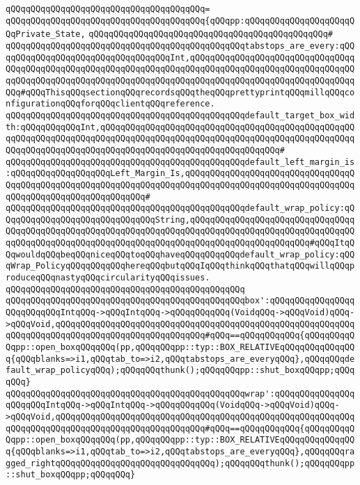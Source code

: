 \verb|qQQqqQQqqQQqqQQqqQQqqQQqqQQqqQQqqQQqqQQq=|\newline
\verb|qQQqqQQqqQQqqQQqqQQqqQQqqQQqqQQqqQQqqQQq{qQQqpp:qQQqqQQqqQQqqQQqqQQqqQQqPrivate_State,|\newline
\verb|qQQqqQQqqQQqqQQqqQQqqQQqqQQqqQQqqQQqqQQqqQQqqQQq#|\newline
\verb|qQQqqQQqqQQqqQQqqQQqqQQqqQQqqQQqqQQqqQQqqQQqqQQqtabstops_are_every:qQQqqQQqqQQqqQQqqQQqqQQqqQQqqQQqqQQqInt,qQQqqQQqqQQqqQQqqQQqqQQqqQQqqQQqqQQqqQQqqQQqqQQqqQQqqQQqqQQqqQQqqQQqqQQqqQQqqQQqqQQqqQQqqQQqqQQqqQQqqQQqqQQqqQQqqQQqqQQqqQQqqQQqqQQqqQQqqQQqqQQqqQQqqQQqqQQqqQQqqQQqqQQqqQQqqQQq#qQQqThisqQQqsectionqQQqrecordsqQQqtheqQQqprettyprintqQQqmillqQQqconfigurationqQQqforqQQqclientqQQqreference.|\newline
\verb|qQQqqQQqqQQqqQQqqQQqqQQqqQQqqQQqqQQqqQQqqQQqqQQqdefault_target_box_width:qQQqqQQqqQQqInt,qQQqqQQqqQQqqQQqqQQqqQQqqQQqqQQqqQQqqQQqqQQqqQQqqQQqqQQqqQQqqQQqqQQqqQQqqQQqqQQqqQQqqQQqqQQqqQQqqQQqqQQqqQQqqQQqqQQqqQQqqQQqqQQqqQQqqQQqqQQqqQQqqQQqqQQqqQQqqQQqqQQqqQQqqQQqqQQq#|\newline
\verb|qQQqqQQqqQQqqQQqqQQqqQQqqQQqqQQqqQQqqQQqqQQqqQQqdefault_left_margin_is:qQQqqQQqqQQqqQQqqQQqLeft_Margin_Is,qQQqqQQqqQQqqQQqqQQqqQQqqQQqqQQqqQQqqQQqqQQqqQQqqQQqqQQqqQQqqQQqqQQqqQQqqQQqqQQqqQQqqQQqqQQqqQQqqQQqqQQqqQQqqQQqqQQqqQQqqQQqqQQqqQQq#|\newline
\verb|qQQqqQQqqQQqqQQqqQQqqQQqqQQqqQQqqQQqqQQqqQQqqQQqdefault_wrap_policy:qQQqqQQqqQQqqQQqqQQqqQQqqQQqqQQqString,qQQqqQQqqQQqqQQqqQQqqQQqqQQqqQQqqQQqqQQqqQQqqQQqqQQqqQQqqQQqqQQqqQQqqQQqqQQqqQQqqQQqqQQqqQQqqQQqqQQqqQQqqQQqqQQqqQQqqQQqqQQqqQQqqQQqqQQqqQQqqQQqqQQqqQQqqQQqqQQqqQQq#qQQqItqQQqwouldqQQqbeqQQqniceqQQqtoqQQqhaveqQQqqQQqqQQqdefault_wrap_policy:qQQqWrap_PolicyqQQqqQQqqQQqhereqQQqbutqQQqIqQQqthinkqQQqthatqQQqwillqQQqproduceqQQqnastyqQQqcircularityqQQqissues.|\newline
\verb|qQQqqQQqqQQqqQQqqQQqqQQqqQQqqQQqqQQqqQQqqQQqqQQq|\newline
\verb|qQQqqQQqqQQqqQQqqQQqqQQqqQQqqQQqqQQqqQQqqQQqqQQqbox':qQQqqQQqqQQqqQQqqQQqqQQqqQQqIntqQQq->qQQqIntqQQq->qQQqqQQqqQQq(VoidqQQq->qQQqVoid)qQQq->qQQqVoid,qQQqqQQqqQQqqQQqqQQqqQQqqQQqqQQqqQQqqQQqqQQqqQQqqQQqqQQqqQQqqQQqqQQqqQQqqQQqqQQqqQQqqQQqqQQqqQQqqQQq#qQQq==qQQqqQQqqQQq{qQQqqQQqqQQqpp::open_boxqQQqqQQq(pp,qQQqqQQqpp::typ::BOX_RELATIVEqQQqqQQqqQQqqQQq{qQQqblanks=>i1,qQQqtab_to=>i2,qQQqtabstops_are_everyqQQq},qQQqqQQqdefault_wrap_policyqQQq);qQQqqQQqthunk();qQQqqQQqpp::shut_boxqQQqpp;qQQqqQQq}|\newline
\verb|qQQqqQQqqQQqqQQqqQQqqQQqqQQqqQQqqQQqqQQqqQQqqQQqwrap':qQQqqQQqqQQqqQQqqQQqqQQqIntqQQq->qQQqIntqQQq->qQQqqQQqqQQq(VoidqQQq->qQQqVoid)qQQq->qQQqVoid,qQQqqQQqqQQqqQQqqQQqqQQqqQQqqQQqqQQqqQQqqQQqqQQqqQQqqQQqqQQqqQQqqQQqqQQqqQQqqQQqqQQqqQQqqQQqqQQqqQQq#qQQq==qQQqqQQqqQQq{qQQqqQQqqQQqpp::open_boxqQQqqQQq(pp,qQQqqQQqpp::typ::BOX_RELATIVEqQQqqQQqqQQqqQQq{qQQqblanks=>i1,qQQqtab_to=>i2,qQQqtabstops_are_everyqQQq},qQQqqQQqragged_rightqQQqqQQqqQQqqQQqqQQqqQQqqQQqqQQq);qQQqqQQqthunk();qQQqqQQqpp::shut_boxqQQqpp;qQQqqQQq}|\newline

